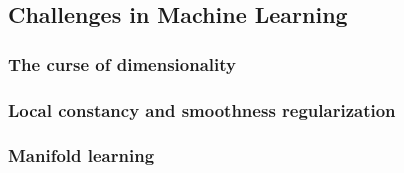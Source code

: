 \subsection{Challenges in Machine Learning}

\subsubsection{The curse of dimensionality}

\subsubsection{Local constancy and smoothness regularization}

\subsubsection{Manifold learning}




